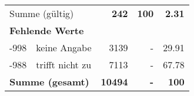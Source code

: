 \begin{longtable}{lXrrr}
     \midrule
     \multicolumn{2}{l}{Summe (gültig)} &
       \textbf{\num{242}} &
     \textbf{\num{100}} &
       \textbf{\num[round-mode=places,round-precision=2]{2.31}} \\
     \multicolumn{5}{l}{\textbf{Fehlende Werte}}\\
       -998 &
       keine Angabe &
         \num{3139} &
        - &
         \num[round-mode=places,round-precision=2]{29.91} \\
       -988 &
       trifft nicht zu &
         \num{7113} &
        - &
         \num[round-mode=places,round-precision=2]{67.78} \\
     \midrule
     \multicolumn{2}{l}{\textbf{Summe (gesamt)}} &
          \textbf{\num{10494}} &
        \textbf{-} &
        \textbf{\num{100}} \\
     \bottomrule
     \end{longtable}
     
